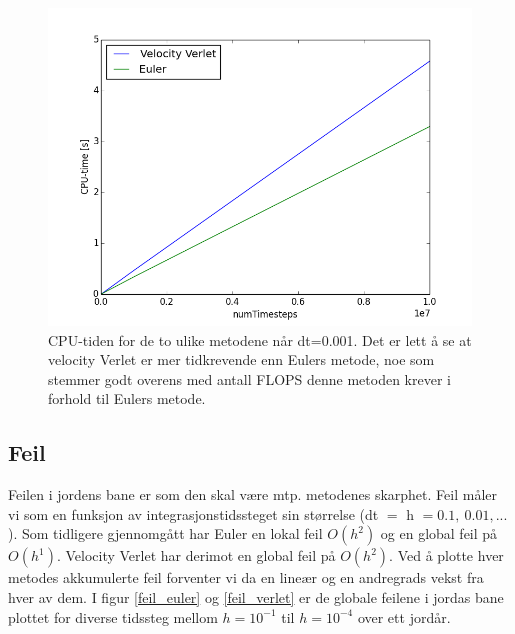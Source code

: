 \documentclass[11pt,a4paper]{article}
\begin{document}
\FloatBarrier
\begin{figure}[!ht]
 \centering
 \includegraphics[scale=0.5]{CPU.png}
 \caption{CPU-tiden for de to ulike metodene når dt=0.001. Det er lett å se at velocity Verlet er mer tidkrevende enn Eulers metode, noe som stemmer godt overens med antall FLOPS denne metoden krever i forhold til Eulers metode.}
 \label{CPU}
 \end{figure}
 \FloatBarrier


\subsection{Feil}
Feilen i jordens bane er som den skal være mtp. metodenes skarphet.
Feil måler vi som en funksjon av integrasjonstidssteget sin størrelse (dt $=$ h $= 0.1, \ 0.01, ...$).
Som tidligere gjennomgått har Euler en lokal feil $O(h^{2})$ og en global feil på $O(h^{1})$.
Velocity Verlet har derimot en global feil på $O(h^{2})$. Ved å plotte hver metodes akkumulerte feil forventer vi da en lineær og en andregrads vekst fra hver av dem.
I figur \ref{feil_euler} og \ref{feil_verlet} er de globale feilene i jordas bane plottet for diverse tidssteg mellom $h=10^{-1}$ til $h=10^{-4}$ over ett jordår.\\
\end{document}
